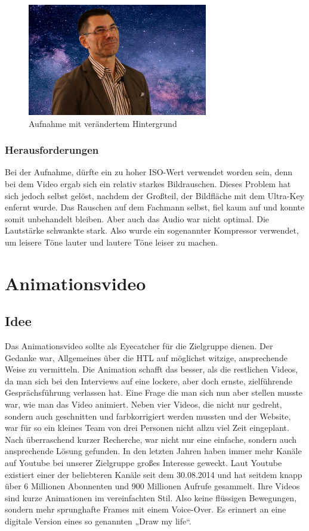 \begin{figure}[H] 
  \centering
     \includegraphics[width=0.7\textwidth]{video_abb2.png}
  \caption{Aufnahme mit verändertem Hintergrund}
\end{figure}

\subsection{Herausforderungen}
Bei der Aufnahme, dürfte ein zu hoher ISO-Wert verwendet worden sein, denn bei dem Video ergab sich ein relativ starkes Bildrauschen.\cite{iso} Dieses Problem hat sich jedoch selbst gelöst, nachdem der Großteil, der Bildfläche mit dem Ultra-Key enfernt wurde. Das Rauschen auf dem Fachmann selbst, fiel kaum auf und konnte somit unbehandelt bleiben. Aber auch das Audio war nicht optimal. Die Lautstärke schwankte stark. Also wurde ein sogenannter Kompressor verwendet, um leisere Töne lauter und lautere Töne leiser zu machen.\cite{kompressor}


\chapter{Animationsvideo}
\section{Idee}
\renewcommand{\kapitelautor}{Autor: Niklas Kienreich}
Das Animationsvideo sollte als Eyecatcher für die Zielgruppe dienen. Der Gedanke war, Allgemeines über die HTL auf möglichst witzige, ansprechende Weise zu vermitteln. Die Animation schafft das besser, als die restlichen Videos, da man sich bei den Interviews auf eine lockere, aber doch ernste, zielführende Gesprächsführung verlassen hat. Eine Frage die man sich nun aber stellen musste war, wie man das Video animiert. Neben vier Videos, die nicht nur gedreht, sondern auch geschnitten und farbkorrigiert werden mussten und der Website, war für so ein kleines Team von drei Personen nicht allzu viel Zeit eingeplant. Nach überraschend kurzer Recherche, war nicht nur eine einfache, sondern auch ansprechende Lösung gefunden. In den letzten Jahren haben immer mehr Kanäle auf Youtube bei unserer Zielgruppe großes Interesse geweckt. Laut Youtube existiert einer der beliebteren Kanäle seit dem 30.08.2014 und hat seitdem knapp über 6 Millionen Abonnenten und 900 Millionen Aufrufe gesammelt.\cite{channel} Ihre Videos sind kurze Animationen im vereinfachten Stil. Also keine flüssigen Bewegungen, sondern mehr sprunghafte Frames mit einem Voice-Over. Es erinnert an eine digitale Version eines so genannten „Draw my life“.
